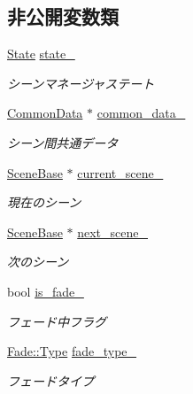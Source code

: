 \subsection*{非公開変数類}
\begin{DoxyCompactItemize}
\item 
\mbox{\hyperlink{class_scene_manager_a68d32794fe1ce945c6a6c380c11a08eb}{State}} \mbox{\hyperlink{class_scene_manager_adf81d8a63dee92bfe5bb934903542bec}{state\+\_\+}}
\begin{DoxyCompactList}\small\item\em シーンマネージャステート \end{DoxyCompactList}\item 
\mbox{\hyperlink{class_scene_manager_1_1_common_data}{Common\+Data}} $\ast$ \mbox{\hyperlink{class_scene_manager_a5f0f0da3d7f9a8a94f0b5a20c3a4908a}{common\+\_\+data\+\_\+}}
\begin{DoxyCompactList}\small\item\em シーン間共通データ \end{DoxyCompactList}\item 
\mbox{\hyperlink{class_scene_base}{Scene\+Base}} $\ast$ \mbox{\hyperlink{class_scene_manager_a62dd6d9d807f0a7f2ea4d014126b765e}{current\+\_\+scene\+\_\+}}
\begin{DoxyCompactList}\small\item\em 現在のシーン \end{DoxyCompactList}\item 
\mbox{\hyperlink{class_scene_base}{Scene\+Base}} $\ast$ \mbox{\hyperlink{class_scene_manager_a7f9bb649125a114715b07154ac3df6ae}{next\+\_\+scene\+\_\+}}
\begin{DoxyCompactList}\small\item\em 次のシーン \end{DoxyCompactList}\item 
bool \mbox{\hyperlink{class_scene_manager_a16f3b953ab3d2804b23ca01d64dc50b2}{is\+\_\+fade\+\_\+}}
\begin{DoxyCompactList}\small\item\em フェード中フラグ \end{DoxyCompactList}\item 
\mbox{\hyperlink{class_fade_ac06f27215b454aa05b93c236476d6e80}{Fade\+::\+Type}} \mbox{\hyperlink{class_scene_manager_af8e268f4b8f39deb1c23b52c22375d8f}{fade\+\_\+type\+\_\+}}
\begin{DoxyCompactList}\small\item\em フェードタイプ \end{DoxyCompactList}\item 

\end{DoxyCompactItemize}
